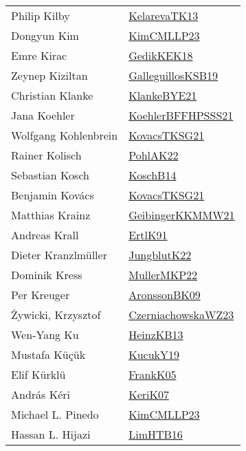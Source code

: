 {\begin{longtable}{p{4cm}p{20cm}}
Philip Kilby & \href{papers/KelarevaTK13.pdf}{KelarevaTK13}\cite{KelarevaTK13} \\
Dongyun Kim & \href{papers/KimCMLLP23.pdf}{KimCMLLP23}\cite{KimCMLLP23} \\
Emre Kirac & \href{articles/GedikKEK18.pdf}{GedikKEK18}\cite{GedikKEK18} \\
Zeynep Kiziltan & \href{papers/GalleguillosKSB19.pdf}{GalleguillosKSB19}\cite{GalleguillosKSB19} \\
Christian Klanke & \href{papers/KlankeBYE21.pdf}{KlankeBYE21}\cite{KlankeBYE21} \\
Jana Koehler & \href{articles/KoehlerBFFHPSSS21.pdf}{KoehlerBFFHPSSS21}\cite{KoehlerBFFHPSSS21} \\
Wolfgang Kohlenbrein & \href{papers/KovacsTKSG21.pdf}{KovacsTKSG21}\cite{KovacsTKSG21} \\
Rainer Kolisch & \href{articles/PohlAK22.pdf}{PohlAK22}\cite{PohlAK22} \\
Sebastian Kosch & \href{papers/KoschB14.pdf}{KoschB14}\cite{KoschB14} \\
Benjamin Kov{\'{a}}cs & \href{papers/KovacsTKSG21.pdf}{KovacsTKSG21}\cite{KovacsTKSG21} \\
Matthias Krainz & \href{papers/GeibingerKKMMW21.pdf}{GeibingerKKMMW21}\cite{GeibingerKKMMW21} \\
Andreas Krall & \href{papers/ErtlK91.pdf}{ErtlK91}\cite{ErtlK91} \\
Dieter Kranzlm{\"{u}}ller & \href{}{JungblutK22}\cite{JungblutK22} \\
Dominik Kress & \href{articles/MullerMKP22.pdf}{MullerMKP22}\cite{MullerMKP22} \\
Per Kreuger & \href{papers/AronssonBK09.pdf}{AronssonBK09}\cite{AronssonBK09} \\
Żywicki, Krzysztof & \href{articles/CzerniachowskaWZ23.pdf}{CzerniachowskaWZ23}\cite{CzerniachowskaWZ23} \\
Wen{-}Yang Ku & \href{papers/HeinzKB13.pdf}{HeinzKB13}\cite{HeinzKB13} \\
Mustafa K{\"u}ç{\"u}k & \href{}{KucukY19}\cite{KucukY19} \\
Elif K{\"{u}}rkl{\"{u}} & \href{papers/FrankK05.pdf}{FrankK05}\cite{FrankK05} \\
Andr{\'{a}}s K{\'{e}}ri & \href{papers/KeriK07.pdf}{KeriK07}\cite{KeriK07} \\
Michael L. Pinedo & \href{papers/KimCMLLP23.pdf}{KimCMLLP23}\cite{KimCMLLP23} \\
Hassan L. Hijazi & \href{papers/LimHTB16.pdf}{LimHTB16}\cite{LimHTB16} \\

\end{longtable}}
